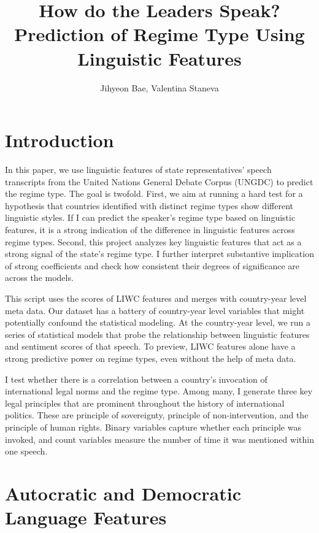 \documentclass[12pt]{article}
\title{How do the Leaders Speak? Prediction of Regime Type Using Linguistic Features}
\author{Jihyeon Bae, Valentina Staneva}
\date{}
\begin{document}
\maketitle

\begin{abstract}

\end{abstract}

\section{Introduction}
In this paper, we use linguistic features of state representatives' speech transcripts from the United Nations General Debate Corpus (UNGDC) to predict the regime type. The goal is twofold. First, we aim at running a hard test for a hypothesis that countries identified with distinct regime types show different linguistic styles. If I can predict the speaker's regime type based on linguistic features, it is a strong indication of the difference in linguistic features across regime types. Second, this project analyzes key linguistic features that act as a strong signal of the state's regime type. I further interpret substantive implication of strong coefficients and check how consistent their degrees of significance are across the models.

This script uses the scores of LIWC features and merges with country-year level meta data. Our dataset has a battery of country-year level variables that might potentially confound the statistical modeling. At the country-year level, we run a series of statistical models that probe the relationship between linguistic features and sentiment scores of that speech. To preview, LIWC features alone have a strong predictive power on regime types, even without the help of meta data. 

I test whether there is a correlation between a country's invocation of international legal norms and the regime type. Among many, I generate three key legal principles that are prominent throughout the history of international politics. These are principle of sovereignty, principle of non-intervention, and the principle of human rights. Binary variables capture whether each principle was invoked, and count variables measure the number of time it was mentioned within one speech.  

\section{Autocratic and Democratic Language Features}
\end{document}
